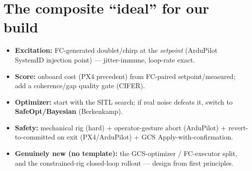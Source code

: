 \documentclass[11pt]{article}
\begin{document}
\section{The composite ``ideal'' for our build}
\begin{itemize}[leftmargin=*,nosep]
\item \textbf{Excitation:} FC-generated doublet/chirp at the \emph{setpoint}
(ArduPilot SystemID injection point) --- jitter-immune, loop-rate exact.
\item \textbf{Score:} onboard cost (PX4 precedent) from FC-paired
setpoint/measured; add a coherence/gap quality gate (CIFER).
\item \textbf{Optimizer:} start with the SITL search; if real noise defeats it,
switch to \textbf{SafeOpt/Bayesian} (Berkenkamp).
\item \textbf{Safety:} mechanical rig (hard) + operator-gesture abort (ArduPilot)
+ revert-to-committed on exit (PX4/ArduPilot) + GCS Apply-with-confirmation.
\item \textbf{Genuinely new (no template):} the GCS-optimizer / FC-executor split,
and the constrained-rig closed-loop rollout --- design from first principles.
\end{itemize}
\end{document}
